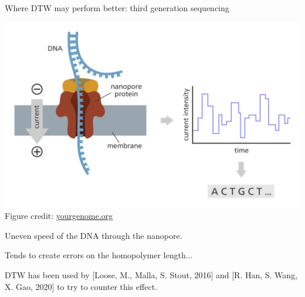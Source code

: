 \begin{frame}{Where DTW may perform better: third generation sequencing}
    \begin{center}
    \includegraphics[scale=0.25]{figures/ont-sequencing_yourgenome.png}\\
    \footnotesize{Figure credit: \href{https://www.yourgenome.org/facts/what-is-oxford-nanopore-technology-ont-sequencing/}{yourgenome.org}}
    \end{center}
    
    Uneven speed of the DNA through the nanopore.\pause
    
    Tends to create errors on the homopolymer length...\pause
    
    DTW has been used by [Loose, M., Malla, S. Stout, 2016] and [R. Han, S. Wang, X. Gao, 2020] to try to counter this effect.
    
\end{frame}

